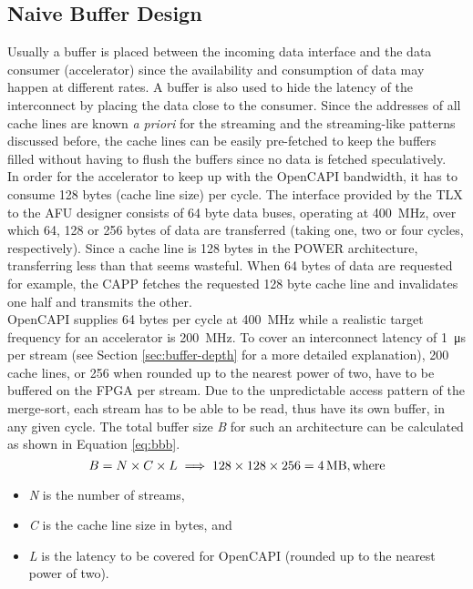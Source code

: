 \subsection{Naive Buffer Design}
\label{sec:naive-design}
Usually a buffer is placed between the incoming data interface and the data consumer (accelerator) since the availability and consumption of data may happen at different rates. A buffer is also used to hide the latency of the interconnect by placing the data close to the consumer. Since the addresses of all cache lines are known \textit{a priori} for the streaming and the streaming-like patterns discussed before, the cache lines can be easily pre-fetched to keep the buffers filled without having to flush the buffers since no data is fetched speculatively.\\
In order for the accelerator to keep up with the OpenCAPI bandwidth, it has to consume 128 bytes (cache line size) per cycle. The interface provided by the TLX to the AFU designer consists of 64 byte data buses, operating at \SI{400}{\mega\hertz}, over which 64, 128 or 256 bytes of data are transferred (taking one, two or four cycles, respectively). Since a cache line is 128 bytes in the POWER architecture, transferring less than that seems wasteful. When 64 bytes of data are requested for example, the CAPP fetches the requested 128 byte cache line and invalidates one half and transmits the other.\\
OpenCAPI supplies 64 bytes per cycle at \SI{400}{\mega\hertz} while a realistic target frequency for an accelerator is \SI{200}{\mega\hertz}. To cover an interconnect latency of \SI{1}{\micro\second} per stream (see Section \ref{sec:buffer-depth} for a more detailed explanation), 200 cache lines, or 256 when rounded up to the nearest power of two, have to be buffered on the FPGA per stream. Due to the unpredictable access pattern of the merge-sort, each stream has to be able to be read, thus have its own buffer, in any given cycle. The total buffer size \textit{B} for such an architecture can be calculated as shown in Equation \ref{eq:bbb}.
\begin{equation}
  B = N \times C \times L \implies 128 \times 128 \times 256 = \SI{4}{\mega\byte}, \text{where}
  \label{eq:bbb}
\end{equation}
\begin{itemize}
  \item{\textit{N} is the number of streams,}
  \item{\textit{C} is the cache line size in bytes, and}
  \item{\textit{L} is the latency to be covered for OpenCAPI (rounded up to the nearest power of two).}
\end{itemize}

